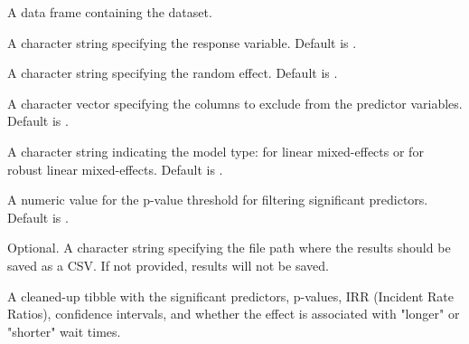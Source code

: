 \documentclass[a4paper]{book}
\begin{document}
\begin{Arguments}
\begin{ldescription}
\item[\code{data}] A data frame containing the dataset.

\item[\code{response\_variable}] A character string specifying the response variable. Default is .

\item[\code{random\_effect}] A character string specifying the random effect. Default is .

\item[\code{excluded\_columns}] A character vector specifying the columns to exclude from the predictor variables.
Default is .

\item[\code{model\_type}] A character string indicating the model type:  for linear mixed-effects or  for robust linear mixed-effects. Default is .

\item[\code{significance\_level}] A numeric value for the p-value threshold for filtering significant predictors. Default is .

\item[\code{output\_path}] Optional. A character string specifying the file path where the results should be saved as a CSV. If not provided, results will not be saved.
\end{ldescription}
\end{Arguments}
%
\begin{Value}
A cleaned-up tibble with the significant predictors, p-values, IRR (Incident Rate Ratios), confidence intervals, and whether the effect is associated with "longer" or "shorter" wait times.
\end{Value}
%
\end{document}
